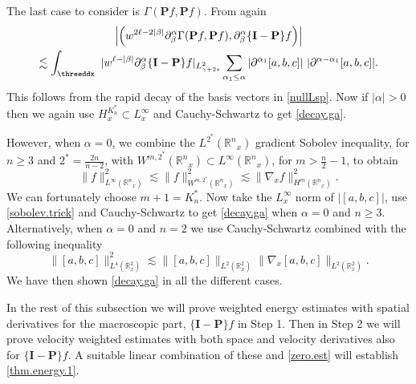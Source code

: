 \documentclass{amsart}
\numberwithin{equation}{section}
\begin{document}
 The last case to consider is $\Gamma ({\mathbf{P}} {f}, {\mathbf{P}} {f})$.  From \cite[Proposition 6.1]{gsNonCut0} again
 \begin{multline}\notag
\left| \left(  w^{2{\ell}-2|\beta|}\partial^\alpha_\beta \Gamma ({\mathbf{P}} {f}, {\mathbf{P}} {f}), \partial^\alpha_\beta \{{\mathbf{I}}-{\mathbf{P}}\}{f} \right) \right|
\\
\lesssim
\int_\threeddx ~ 
{|} w^{{\ell}-|\beta|} \partial^\alpha_\beta \{{\mathbf{I}}-{\mathbf{P}}\}{f}{|}_{L^2_{\gamma+2s}}
\sum_{{\alpha}_1 \le {\alpha} }
|{\partial}^{{\alpha}_1} [a,b,c]| ~|{\partial}^{{\alpha}-{\alpha}_1} [a,b,c]|.
\end{multline}
This follows from the rapid decay of the basis vectors in \eqref{nullLsp}.  Now if $|{\alpha}|>0$ then we again use
$H^{K^*_n}_x \subset L^\infty_x$ and Cauchy-Schwartz to get \eqref{decay.ga}.

However, when ${\alpha} =0$, we combine the $L^{2^*}({{\mathbb R}^{n}}_x)$ gradient Sobolev inequality, for ${n} \ge 3$
and $2^* = \frac{2n}{n-2}$,
with $W^{m,2^*}({{\mathbb R}^{n}}_x)\subset L^\infty ({{\mathbb R}^{n}}_x)$, for $m> \frac{n}{2}-1$,
 to obtain
\begin{equation}
 \|{f} \|^2_{L^\infty({{\mathbb R}^{n}}_x)}
\lesssim
 \|{f} \|^2_{W^{m,2^*}({{\mathbb R}^{n}}_x)}
\lesssim
 \|\nabla_x {f}\|^2_{H^{m}({{\mathbb R}^{n}}_x)}.
\label{sobolev.trick}
\end{equation}
We can fortunately choose $m+1= {K^*_n}$.    Now take the $L^\infty_x$ norm of 
$| [a,b,c]|$, use \eqref{sobolev.trick} and Cauchy-Schwartz to get \eqref{decay.ga} when ${\alpha} =0$ and ${n} \ge 3$.
Alternatively, when ${\alpha} =0$ and ${n} =2$ we use Cauchy-Schwartz combined with the following inequality
$$
\| [a,b,c] \|_{L^4({\mathbb{R}}^2_x)}^2
\lesssim
\| [a,b,c] \|_{L^2({\mathbb{R}}^2_x)}
\| \nabla_x [a,b,c] \|_{L^2({\mathbb{R}}^2_x)}.
$$
We have then shown \eqref{decay.ga} in all the different cases.

In the rest of this subsection we will prove weighted energy estimates with spatial derivatives for the macroscopic part, $\{{\mathbf{I}}-{\mathbf{P}}\}{f}$ in Step 1.  Then in Step 2 we will prove velocity weighted estimates with both space and velocity derivatives also for $\{{\mathbf{I}}-{\mathbf{P}}\}{f}$.  A suitable linear combination of these and \eqref{zero.est} will establish \eqref{thm.energy.1}.

\medskip
\end{document}
